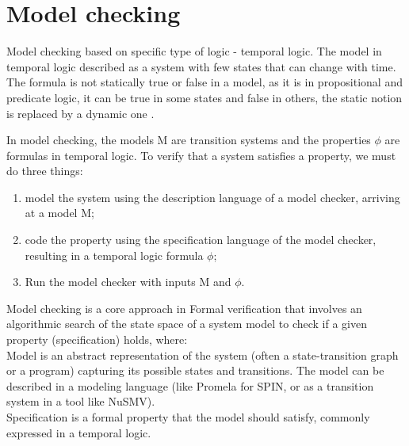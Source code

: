 %
%
%
%
%
%
%


\section{Model checking}

Model checking  based  on specific type of logic - temporal logic. 
The model in temporal logic described as a system with few states that can change with time.
The formula is not statically true or false in a model, as it is in propositional and predicate logic,
it can be true in some states and false in others, the static notion is replaced 
by a dynamic one \cite{HuthR1}.

In model checking, the models M are transition systems and the properties $\phi$ are formulas in temporal logic. 
To verify that a system satisfies a property, we must do three things:
\begin{enumerate}
    \item model the system using the description language of a model checker, arriving at a model M;
    \item code the property using the specification language of the model checker, resulting in a temporal logic formula $\phi$;
    \item Run the model checker with inputs M and $\phi$.
\end{enumerate}



Model checking is a core approach in Formal verification that involves an algorithmic search of the state space of a system model to check if a
given property (specification) holds, where:\\
Model is an abstract representation of the system (often a state-transition graph or a
program) capturing its possible states and transitions. The model can be described in a modeling language
(like Promela for SPIN, or as a transition system in a tool like NuSMV). \\
Specification is a formal property that the model should satisfy, 
commonly expressed in a temporal logic. 


